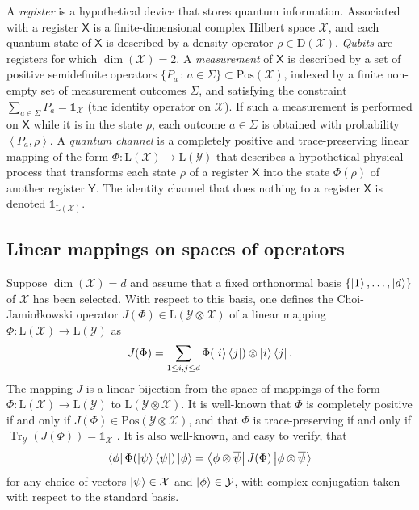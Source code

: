 \documentclass[11pt,letterpaper]{article}
\theoremstyle{definition}
\newcommand{\microspace}{\mspace{0.5mu}}
\newcommand{\op}[1]{\operatorname{#1}}
\newcommand{\tr}{\operatorname{Tr}}
\newcommand{\ip}[2]{\left\langle #1 , #2\right\rangle}
\def\I{\mathbb{1}}
\newcommand{\setft}[1]{\mathrm{#1}}
\newcommand{\lin}[1]{\setft{L}\left(#1\right)}
\newcommand{\density}[1]{\setft{D}\left(#1\right)}
\newcommand{\pos}[1]{\setft{Pos}\left(#1\right)}
\def \lket {\left|}
\def \rket {\right\rangle}
\def \lbra {\left\langle}
\def \rbra {\right|}
\newcommand{\ket}[1]{\lket\microspace #1 \microspace\rket}
\newcommand{\bra}[1]{\lbra\microspace #1 \microspace\rbra}
\newcommand{\reg}[1]{\mathsf{#1}}
\def\X{\mathcal{X}}
\def\Y{\mathcal{Y}}
\begin{document}
A \emph{register} is a hypothetical device that stores quantum
information.
Associated with a register $\reg{X}$ is a finite-dimensional complex
Hilbert space $\X$, and each quantum state of $\reg{X}$ is described
by a density operator $\rho\in\density{\X}$.
\emph{Qubits} are registers for which $\dim(\X) = 2$.
A \emph{measurement} of $\reg{X}$ is described by a set of positive
semidefinite operators $\{P_a\,:\,a\in\Sigma\}\subset\pos{\X}$,
indexed by a finite non-empty set of measurement outcomes $\Sigma$,
and satisfying the constraint $\sum_{a\in\Sigma}P_a = \I_{\X}$ (the
identity operator on $\X$).
If such a measurement is performed on $\reg{X}$ while it is in the
state $\rho$, each outcome $a\in\Sigma$ is obtained with probability
$\ip{P_a}{\rho}$.
A \emph{quantum channel} is a completely positive and trace-preserving
linear mapping of the form \mbox{$\Phi:\lin{\X}\rightarrow\lin{\Y}$} that
describes a hypothetical physical process that transforms each state
$\rho$ of a register $\reg{X}$ into the state $\Phi(\rho)$ of another
register $\reg{Y}$.
The identity channel that does nothing to a register $\reg{X}$ is
denoted $\I_{\lin{\X}}$.

\subsection{Linear mappings on spaces of operators}

Suppose $\op{dim}(\X) = d$ and assume that a fixed orthonormal basis
$\{\ket{1},\ldots,\ket{d}\}$ of $\X$ has been selected.
With respect to this basis, one defines the Choi-Jamio{\l}kowski
operator $J(\Phi)\in\lin{\Y\otimes\X}$ of a linear mapping
$\Phi:\lin{\X}\rightarrow\lin{\Y}$ as
\[
J(\Phi) = \sum_{1\leq i,j \leq d}
\Phi(\ket{i}\bra{j}) \otimes \ket{i}\bra{j}.
\]
The mapping $J$ is a linear bijection from the space of mappings of
the form $\Phi:\lin{\X}\rightarrow\lin{\Y}$ to 
$\lin{\Y\otimes\X}$.
It is well-known that $\Phi$ is completely positive if and only if
$J(\Phi) \in \pos{\Y\otimes\X}$, and that $\Phi$ is trace-preserving
if and only if $\tr_{\Y}(J(\Phi)) = \I_{\X}$
\cite{Choi75,Jamiolkowski72}. It is also well-known, and easy to verify, that
\begin{equation}\label{eq:jphi}
\bra{\phi} \Phi(\ket{\psi}\bra{\psi}) \ket{\phi}
= \bra{\phi \otimes \overline{\psi}} J(\Phi)\ket{\phi \otimes
  \overline{\psi}}
\end{equation}
for any choice of vectors $\ket{\psi}\in\X$ and
$\ket{\phi}\in\Y$, with
complex conjugation taken with respect to the standard basis.
\end{document}
